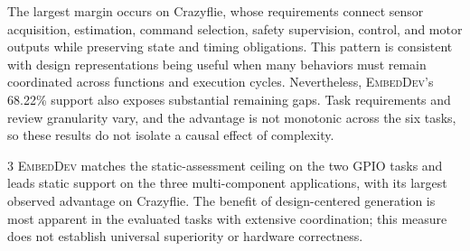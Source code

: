 The largest margin occurs on Crazyflie, whose requirements connect sensor acquisition, estimation, command selection, safety supervision, control, and motor outputs while preserving state and timing obligations. This pattern is consistent with design representations being useful when many behaviors must remain coordinated across functions and execution cycles. Nevertheless, \textsc{EmbedDev}'s 68.22\% support also exposes substantial remaining gaps. Task requirements and review granularity vary, and the advantage is not monotonic across the six tasks, so these results do not isolate a causal effect of complexity.

\begin{rqanswer}{3}
\textsc{EmbedDev} matches the static-assessment ceiling on the two GPIO tasks and leads static support on the three multi-component applications, with its largest observed advantage on Crazyflie. The benefit of design-centered generation is most apparent in the evaluated tasks with extensive coordination; this measure does not establish universal superiority or hardware correctness.
\end{rqanswer}
